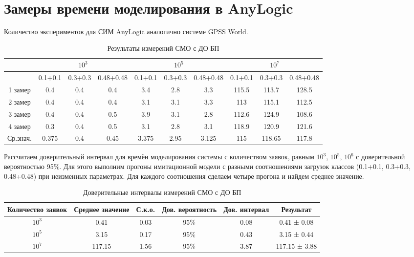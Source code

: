 \documentclass[a4paper,14pt]{report} %
\begin{document}
\section{Замеры времени моделирования в AnyLogic}
Количество экспериментов для СИМ AnyLogic аналогично системе GPSS World.

\begin{table}[h]
\caption{Результаты измерений СМО с ДО БП}
\begin{tabular}{|c|c|c|c|c|c|c|c|c|c|}
\hline
 & \multicolumn{3}{|c|}{$10^3$} & \multicolumn{3}{|c|}{$10^5$} & \multicolumn{3}{|c|}{$10^7$} \\
\hline
 & 0.1+0.1 & 0.3+0.3 & 0.48+0.48 & 0.1+0.1 & 0.3+0.3 & 0.48+0.48 & 0.1+0.1 & 0.3+0.3 & 0.48+0.48 \\
\hline
1 замер & 0.4 & 0.4 & 0.4 & 3.4 & 2.8 & 3.3 & 115.5 & 113.7 & 128.5 \\
\hline
2 замер & 0.4 & 0.4 & 0.4 & 3.1 & 3.1 & 3.3 & 113 & 115.1 & 112.5 \\
\hline
3 замер & 0.4 & 0.4 & 0.5 & 3.9 & 3.1 & 2.8 & 112.6 & 124.9 & 108.6 \\
\hline
4 замер & 0.3 & 0.4 & 0.5 &3.1 & 2.8 & 3.1 & 118.9 & 120.9 & 121.6 \\
\hline
Ср.знач. & 0.375 & 0.4 & 0.45 & 3.375 & 2.95 & 3.125 & 115 & 118.65 & 117.8 \\
\hline
\end{tabular}
\end{table} 

Рассчитаем доверительный интервал для времён моделирования системы с количеством заявок, равным $10^3$, $10^5$, $10^6$ с доверительной вероятностью 95\%. Для этого выполним прогоны имитационной модели с разными соотношениями загрузок классов (0.1+0.1, 0.3+0.3, 0.48+0.48) при неизменных параметрах. Для каждого соотношения сделаем четыре прогона и найдем среднее значение.

\begin{table}[h]
\caption{Доверительные интервалы измерений СМО с ДО БП}
\begin{tabular}{|c|c|c|c|c|c|}
\hline
 Количество заявок & Среднее значение & С.к.о. & Дов. вероятность & Дов. интервал & Результат\\
\hline
$10^3$ & 0.41 & 0.03 & 95\% & 0.08 & 0.41 ± 0.08 \\
\hline
$10^5$ & 3.15 & 0.17 & 95\% & 0.43 & 3.15 ± 0.44 \\
\hline
$10^7$ & 117.15 & 1.56 & 95\% &3.87 & 117.15 ± 3.88 \\
\hline
\end{tabular}
\end{table} 
\end{document}
